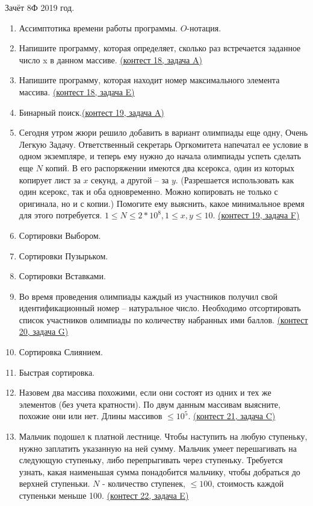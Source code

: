 \documentclass[a4paper,12pt]{article}
\begin{document}
Зачёт 8Ф 2019 год.
\begin{enumerate}
\item Ассимптотика времени работы программы. $O$-нотация.
\item Напишите программу, которая определяет, сколько раз встречается заданное число x в данном массиве. \href{https://informatics.msk.ru/mod/statements/view3.php?chapterid=223}{(контест 18, задача A)}
\item Напишите программу, которая находит номер максимального элемента массива. \href{https://informatics.msk.ru/mod/statements/view3.php?chapterid=228}{(контест 18, задача E)}
\item Бинарный поиск.\href{https://informatics.msk.ru/mod/statements/view3.php?chapterid=111728}{(контест 19, задача A)}
\item Сегодня утром жюри решило добавить в вариант олимпиады еще одну, Очень Легкую Задачу. Ответственный секретарь Оргкомитета напечатал ее условие в одном экземпляре, и теперь ему нужно до начала олимпиады успеть сделать еще $N$ копий. В его распоряжении имеются два ксерокса, один из которых копирует лист за $x$ секунд, а другой – за $y$. (Разрешается использовать как один ксерокс, так и оба одновременно. Можно копировать не только с оригинала, но и с копии.) Помогите ему выяснить, какое минимальное время для этого потребуется. $1\le N\le 2*10^8, 1\le x, y \le 10$. \href{https://informatics.msk.ru/mod/statements/view3.php?chapterid=490}{(контест 19, задача F)}
\item Сортировки Выбором.
\item Сортировки Пузырьком.
\item Сортировки Вставками.
\item Во время проведения олимпиады каждый из участников получил свой идентификационный номер – натуральное число. Необходимо отсортировать список участников олимпиады по количеству набранных ими баллов. \href{https://informatics.msk.ru/mod/statements/view3.php?chapterid=1446}{(контест 20, задача G)}
\item Сортировка Слиянием.
\item Быстрая сортировка.
\item Назовем два массива похожими, если они состоят из одних и тех же элементов (без учета кратности). По двум данным массивам выясните, похожие они или нет. Длины массивов $\le 10^5$. \href{https://informatics.msk.ru/mod/statements/view3.php?chapterid=767}{(контест 21, задача C)}
\item Мальчик подошел к платной лестнице. Чтобы наступить на любую ступеньку, нужно заплатить указанную на ней сумму. Мальчик умеет перешагивать на следующую ступеньку, либо перепрыгивать через ступеньку. Требуется узнать, какая наименьшая сумма понадобится мальчику, чтобы добраться до верхней ступеньки. $N$ - количество ступенек, $\le 100$, стоимость каждой ступеньки меньше 100. \href{https://informatics.msk.ru/mod/statements/view3.php?chapterid=915}{(контест 22, задача E)}

\end{enumerate}
\end{document}
